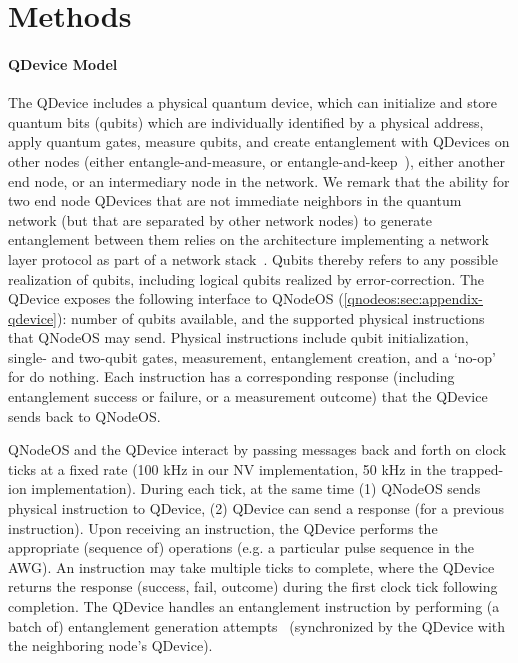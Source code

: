 \section{Methods}
\label{qnodeos:sec:methods}

\paragraph{QDevice Model}

The QDevice includes a physical quantum device, which can initialize and store quantum bits (qubits) which are individually identified by a physical address, apply quantum gates, measure qubits, and create entanglement with QDevices on other nodes (either entangle-and-measure, or entangle-and-keep~\cite{dahlberg_2019_egp}), either another end node, or an intermediary node in the network.
We remark that the ability for two end node QDevices that are not immediate neighbors in the quantum network (but that are separated by other network nodes) to generate entanglement between them relies on the architecture implementing a network layer protocol as part of a network stack~\cite{dahlberg_2019_egp}.
Qubits thereby refers to any possible realization of qubits, including logical qubits realized by error-correction.
The QDevice exposes the following interface to QNodeOS (\cref{qnodeos:sec:appendix-qdevice}): number of qubits available, and the supported physical instructions that QNodeOS may send.
Physical instructions include qubit initialization, single- and two-qubit gates, measurement, entanglement creation, and a `no-op' for do nothing.
Each instruction has a corresponding response (including entanglement success or failure, or a measurement outcome) that the QDevice sends back to QNodeOS.

QNodeOS and the QDevice interact by passing messages back and forth on clock ticks at a fixed rate (100 kHz in our NV implementation, 50 kHz in the trapped-ion implementation).
During each tick, at the same time (1) QNodeOS sends physical instruction to QDevice, (2) QDevice can send a response (for a previous instruction).
Upon receiving an instruction, the QDevice performs the appropriate (sequence of) operations (e.g. a particular pulse sequence in the AWG).
An instruction may take multiple ticks to complete, where the QDevice returns the response (success, fail, outcome) during the first clock tick following completion.
The QDevice handles an entanglement instruction by performing (a batch of) entanglement generation attempts~\cite{pompili_2022_experimental} (synchronized by the QDevice with the neighboring node's QDevice). 

